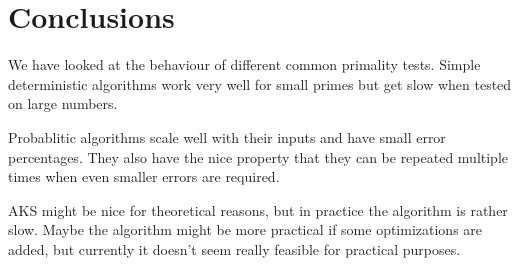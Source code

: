 \section{Conclusions}


We have looked at the behaviour of different common primality tests.
Simple deterministic algorithms work very well for small primes but get slow when tested on large numbers.

Probablitic algorithms scale well with their inputs and have small error percentages.
They also have the nice property that they can be repeated multiple times when even smaller errors are required.

AKS might be nice for theoretical reasons, but in practice the algorithm is rather slow.
Maybe the algorithm might be more practical if some optimizations are added, but currently it doesn't seem really feasible for practical purposes.
